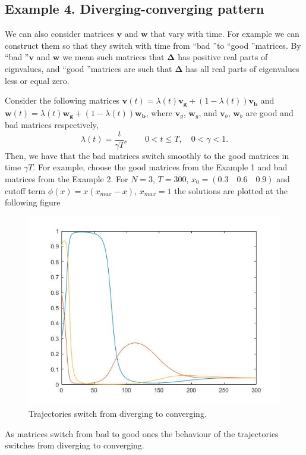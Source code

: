 \documentclass[a4paper,10pt, english]{article}
\begin{document}
\newpage
\newpage
\newpage
\subsection{Example 4. Diverging-converging pattern}
We can also consider matrices $\mathbf{v}$ and $\mathbf{w}$ that vary with time. For example we can construct them so that they switch with time from \textquotedblleft bad \textquotedblright to  \textquotedblleft good \textquotedblright  matrices.
By  \textquotedblleft bad \textquotedblright  $\mathbf{v}$ and $\mathbf{w}$  we mean such  matrices that $\mathbf{\Delta}$ has positive real parts of eignvalues, and  \textquotedblleft good \textquotedblright  matrices are such that $\mathbf{\Delta}$ has all real parts of eigenvalues less or equal zero.

Consider the following matrices $\mathbf{v}(t) = \lambda(t)\mathbf{v_g} + (1-\lambda(t))\mathbf{v_b}$ and  $\mathbf{w}(t) = \lambda(t)\mathbf{w_g} + (1-\lambda(t))\mathbf{w_b}$, where $\mathbf{v}_g$, $\mathbf{w}_g$, and $\mathbf{v}_b$, $\mathbf{w}_b$ are good and bad matrices respectively,
$$
\lambda(t) = \frac{t}{\gamma T}, \qquad 0<t\leq T, \quad 0<\gamma<1.
$$
Then, we have that the bad matrices switch smoothly to the good matrices in time $\gamma T$.
For example, choose the good matrices from the Example 1 and bad matrices from the Example 2. For $N=3$, $T=300$, $x_0 = (0.3\quad 0.6\quad 0.9)$ and cutoff term $\phi(x) = x(x_{max} - x)$, $x_{max} = 1$ the solutions are plotted at the following figure


\begin{figure}[ht]
\label{fig_c4}
\centering
\includegraphics[scale= 0.4]{switch.jpg}
\caption{Trajectories switch from diverging to converging.}
\end{figure}
As matrices switch from bad to good ones the behaviour of the trajectories switches from diverging to converging.
\end{document}
